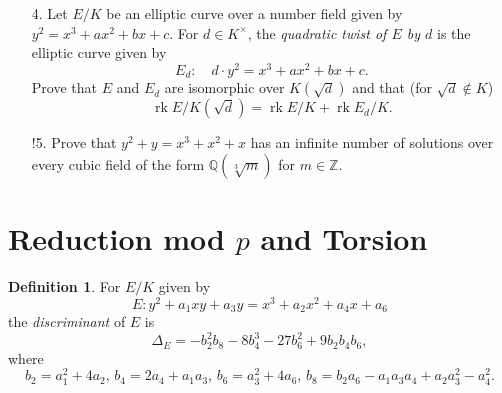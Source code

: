 \documentclass[a4paper]{article}
\theoremstyle{definition}
\newtheorem*{definition}{Definition}
\DeclareMathOperator{\Hom}{Hom}
\DeclareMathOperator{\rk}{rk}
\newcommand{\Z}{\mathbb{Z}}
\newcommand{\Q}{\mathbb{Q}}
\begin{document}
\begin{enumerate}
\begin{proof}[Solution]
            Now by the Mordell--Weil Theorem we have $E(K)\cong\Delta\times\Z^r$
            for some finite group $\Delta$, where $r$ is the rank. Then
            \begin{equation*}
                E(K)/2E(K) \cong E(K)[2]\times C_2^r \cong C_2^{r+2},
            \end{equation*}
            and from above this is a subgroup of
            \begin{equation*}
                \Hom(G,E(K)[2]) = \Hom(C_2^n,C_2\times C_2) = C_2^{2n}.
            \end{equation*}
            Hence $r+2\le2n$, i.e. $r\le2n-2$.
        \end{proof}

    \item[4.] Let $E/K$ be an elliptic curve over a number field given by
        $y^2=x^3+ax^2+bx+c$. For $d\in K^\times$, the \emph{quadratic twist of
        $E$ by $d$} is the elliptic curve given by
        \begin{equation*}
            E_d:\quad d\cdot y^2=x^3+ax^2+bx+c.
        \end{equation*}
        Prove that $E$ and $E_d$ are isomorphic over $K(\sqrt d)$ and that (for
        $\sqrt d\notin K$)
        \begin{equation*}
            \rk E/K(\sqrt d) = \rk E/K + \rk E_d/K.
        \end{equation*}

    \item[!5.] Prove that $y^2+y=x^3+x^2+x$ has an infinite number of solutions
        over every cubic field of the form $\Q(\sqrt[3]{m})$ for $m\in\Z$.
\end{enumerate}

\section{Reduction mod $p$ and Torsion}

\begin{definition}
    For $E/K$ given by
    \begin{equation*}
        E: y^2 + a_1xy + a_3y = x^3 + a_2x^2 + a_4x + a_6 \tag{$*$}
    \end{equation*}
    the \emph{discriminant} of $E$ is
    \begin{equation*}
        \Delta_E = -b_2^2b_8 - 8b_4^3 - 27b_6^2 + 9b_2b_4b_6,
    \end{equation*}
    where
    \begin{equation*}
        b_2=a_1^2+4a_2,\,
        b_4=2a_4+a_1a_3,\,
        b_6=a_3^2+4a_6,\,
        b_8=b_2a_6-a_1a_3a_4+a_2a_3^2-a_4^2.
    \end{equation*}
\end{definition}
\end{document}
